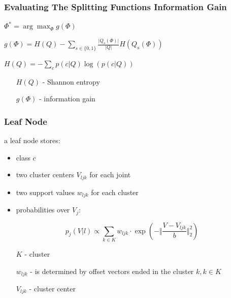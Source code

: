 \documentclass[xcolor=dvipsnames]{beamer}
\begin{document}
\begin{frame}
	\frametitle{Evaluating The Splitting Functions Information Gain}
	\large

	\vspace{1cm}
	$\Phi^* = \arg\max_\Phi g(\Phi)$
	\vspace{1cm}
	
	$g(\Phi) = H(Q) - \sum\limits_{s \in \{0, 1\}}^{} \frac{\vert Q_s(\Phi) \vert}{\vert Q \vert} H(Q_s(\Phi))$
	\vspace{1cm}
	
	$H(Q) = - \sum\limits_{c}^{} p(c | Q) \log( p(c | Q) )$
	
	\vspace{1cm}
	\normalsize
	\begin{itemize}
		\item[$H(Q)$ - ] Shannon entropy
		\item[$g(\Phi)$ - ] information gain
	\end{itemize}
\end{frame}

\begin{frame}
	\frametitle{Leaf Node}
	\large
	
	a leaf node stores:
	\begin{itemize}
		\item class $c$
		\item two cluster centers $V_{ljk}$ for each joint
		\item two support values $w_{ljk}$ for each cluster
		\item probabilities over $V_j$:
	\end{itemize}
	
	\begin{equation*}
		p_j(V | l) \propto \sum\limits_{k \in K}^{} w_{ljk} \cdot \exp(- \Vert \frac{V - V_{ljk}}{b} \Vert^2_2)
	\end{equation*}
	\vspace{.5cm}
	\begin{itemize}
		\item[$K$ - ] cluster
		\item[$w_{ljk}$ - ] is determined by offset vectors ended in the cluster $k, k \in K$
		\item[$V_{ljk}$ - ] cluster center
	\end{itemize}
\end{frame}
\end{document}
